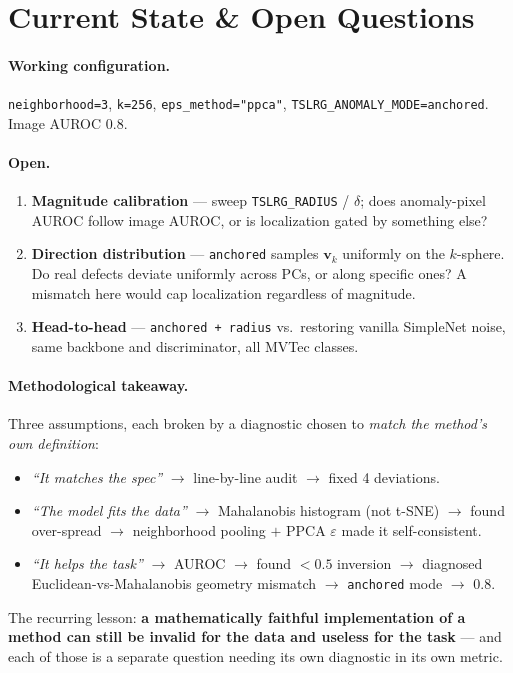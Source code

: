 \documentclass[11pt]{article}
\newcommand{\code}[1]{\texttt{#1}}
\begin{document}
\section{Current State \& Open Questions}

\paragraph{Working configuration.}
\code{neighborhood=3}, \code{k=256}, \code{eps\_method="ppca"},
\code{TSLRG\_ANOMALY\_MODE=anchored}. Image AUROC $0.8$.

\paragraph{Open.}
\begin{enumerate}[noitemsep]
  \item \textbf{Magnitude calibration} --- sweep \code{TSLRG\_RADIUS} / $\delta$;
    does anomaly-pixel AUROC follow image AUROC, or is localization gated by
    something else?
  \item \textbf{Direction distribution} --- \code{anchored} samples
    $\mathbf{v}_k$ uniformly on the $k$-sphere. Do real defects deviate uniformly
    across PCs, or along specific ones? A mismatch here would cap localization
    regardless of magnitude.
  \item \textbf{Head-to-head} --- \code{anchored + radius} vs.\ restoring vanilla
    SimpleNet noise, same backbone and discriminator, all MVTec classes.
\end{enumerate}

\paragraph{Methodological takeaway.}
Three assumptions, each broken by a diagnostic chosen to \emph{match the method's
own definition}:
\begin{itemize}[noitemsep]
  \item \emph{``It matches the spec''} $\to$ line-by-line audit $\to$ fixed 4
    deviations.
  \item \emph{``The model fits the data''} $\to$ Mahalanobis histogram (not t-SNE)
    $\to$ found over-spread $\to$ neighborhood pooling $+$ PPCA $\varepsilon$ made
    it self-consistent.
  \item \emph{``It helps the task''} $\to$ AUROC $\to$ found $<0.5$ inversion
    $\to$ diagnosed Euclidean-vs-Mahalanobis geometry mismatch $\to$
    \code{anchored} mode $\to$ $0.8$.
\end{itemize}
The recurring lesson: \textbf{a mathematically faithful implementation of a method
can still be invalid for the data and useless for the task} --- and each of those
is a separate question needing its own diagnostic in its own metric.
\end{document}
